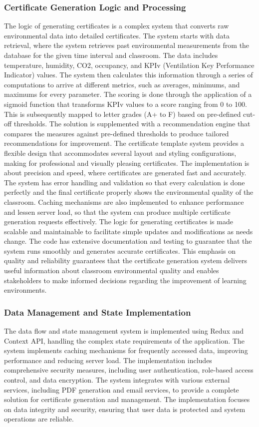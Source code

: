 \subsubsection{Certificate Generation Logic and Processing}
The logic of generating certificates is a complex system that converts raw environmental data into detailed certificates. The system starts with data retrieval, where the system retrieves past environmental measurements from the database for the given time interval and classroom. The data includes temperature, humidity, CO2, occupancy, and KPIv (Ventilation Key Performance Indicator) values. The system then calculates this information through a series of computations to arrive at different metrics, such as averages, minimums, and maximums for every parameter.
The scoring is done through the application of a sigmoid function that transforms KPIv values to a score ranging from 0 to 100. This is subsequently mapped to letter grades (A+ to F) based on pre-defined cut-off thresholds. The solution is supplemented with a recommendation engine that compares the measures against pre-defined thresholds to produce tailored recommendations for improvement. The certificate template system provides a flexible design that accommodates several layout and styling configurations, making for professional and visually pleasing certificates.
The implementation is about precision and speed, where certificates are generated fast and accurately. The system has error handling and validation so that every calculation is done perfectly and the final certificate properly shows the environmental quality of the classroom. Caching mechanisms are also implemented to enhance performance and lessen server load, so that the system can produce multiple certificate generation requests effectively. The logic for generating certificates is made scalable and maintainable to facilitate simple updates and modifications as needs change. The code has extensive documentation and testing to guarantee that the system runs smoothly and generates accurate certificates. This emphasis on quality and reliability guarantees that the certificate generation system delivers useful information about classroom environmental quality and enables stakeholders to make informed decisions regarding the improvement of learning environments.

\subsubsection{Data Management and State Implementation}
The data flow and state management system is implemented using Redux and Context API, handling the complex state requirements of the application. The system implements caching mechanisms for frequently accessed data, improving performance and reducing server load. The implementation includes comprehensive security measures, including user authentication, role-based access control, and data encryption. The system integrates with various external services, including PDF generation and email services, to provide a complete solution for certificate generation and management. The implementation focuses on data integrity and security, ensuring that user data is protected and system operations are reliable.

